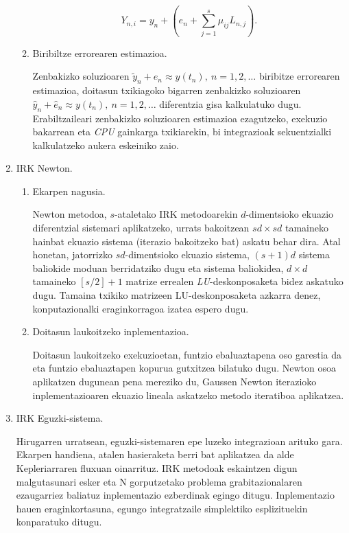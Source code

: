 \begin{enumerate}
\begin{enumerate}
\begin{equation*}
Y_{n,i}=y_n + \left(e_n+ \sum_{j=1}^{s}\mu_{ij} L_{n,j} \right).
\end{equation*}
  
\item Biribiltze errorearen estimazioa.

Zenbakizko soluzioaren $\tilde{y}_n+e_n \approx y(t_n), \ n=1,2,\dots$ biribitze errorearen estimazioa, doitasun txikiagoko bigarren zenbakizko soluzioaren $\hat{y}_n+\hat{e}_n \approx y(t_n), \ n=1,2,\dots$  diferentzia gisa kalkulatuko dugu.
Erabiltzaileari zenbakizko soluzioaren estimazioa ezagutzeko, exekuzio bakarrean  eta \emph{CPU} gainkarga txikiarekin, bi integrazioak sekuentzialki kalkulatzeko aukera eskeiniko zaio. 


\end{enumerate}


\item IRK Newton.

\begin{enumerate}
\item Ekarpen nagusia.

Newton metodoa, $s$-ataletako IRK metodoarekin $d$-dimentsioko ekuazio diferentzial  sistemari aplikatzeko, urrats bakoitzean $sd \times sd$ tamaineko hainbat ekuazio sistema (iterazio bakoitzeko bat) askatu behar dira. Atal honetan, jatorrizko $sd$-dimentsioko ekuazio sistema, $(s+1)d$ sistema baliokide moduan berridatziko dugu eta sistema baliokidea,  $d \times d$ tamaineko $[s/2]+1$ matrize errealen \emph{LU}-deskonposaketa bidez askatuko dugu. Tamaina txikiko matrizeen LU-deskonposaketa azkarra denez, konputazionalki eraginkorragoa izatea espero dugu.   

\item Doitasun laukoitzeko inplementazioa.

Doitasun laukoitzeko exekuzioetan, funtzio ebaluaztapena oso garestia da eta funtzio ebaluaztapen kopurua gutxitzea bilatuko dugu. Newton osoa aplikatzen dugunean pena mereziko du, Gaussen Newton iterazioko inplementazioaren ekuazio lineala askatzeko metodo iteratiboa aplikatzea. 

\end{enumerate}
  

\item IRK Eguzki-sistema.

Hirugarren urratsean, eguzki-sistemaren epe luzeko integrazioan arituko gara. Ekarpen handiena, atalen hasieraketa berri bat aplikatzea da alde Kepleriarraren fluxuan oinarrituz. IRK metodoak eskaintzen digun malgutasunari esker eta N gorputzetako problema grabitazionalaren ezaugarriez baliatuz inplementazio ezberdinak egingo ditugu. Inplementazio hauen eraginkortasuna, egungo integratzaile simplektiko esplizituekin konparatuko ditugu.


\end{enumerate}
